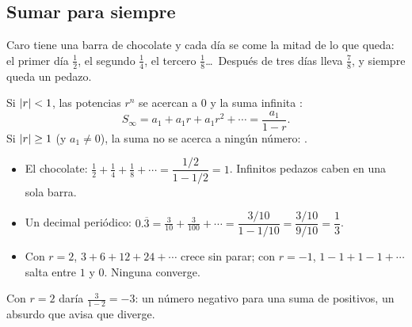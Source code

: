 \documentclass[11pt,a4paper]{article}
\begin{document}
\subsection{Sumar para siempre}
Caro tiene una barra de chocolate y cada día se come la mitad de lo que queda: el primer día $\frac12$, el segundo
$\frac14$, el tercero $\frac18$\dots\ Después de tres días lleva $\frac78$, y siempre queda un pedazo.
\begin{figura}
\end{figura}

\begin{propiedad}
Si $\left\lvert r\right\rvert<1$, las potencias $r^{n}$ se acercan a $0$ y la suma infinita :
\[ S_\infty=a_1+a_1r+a_1r^{2}+\cdots=\frac{a_1}{1-r}. \]
Si $\left\lvert r\right\rvert\ge 1$ (y $a_1\neq0$), la suma no se acerca a ningún número: .
\end{propiedad}
\begin{ejemplo}
\begin{itemize}
\item El chocolate: $\frac12+\frac14+\frac18+\cdots=\dfrac{1/2}{1-1/2}=1$. Infinitos pedazos caben en una sola barra.
\item Un decimal periódico: $0.\overline{3}=\frac{3}{10}+\frac{3}{100}+\cdots=\dfrac{3/10}{1-1/10}=\dfrac{3/10}{9/10}=\dfrac13$.
\item Con $r=2$, $3+6+12+24+\cdots$ crece sin parar; con $r=-1$, $1-1+1-1+\cdots$ salta entre $1$ y $0$. Ninguna converge.
\end{itemize}
\end{ejemplo}
\begin{ojo}
Con $r=2$ daría $\frac{3}{1-2}=-3$: un número negativo para una suma de positivos, un absurdo que avisa que diverge.
\end{ojo}
\end{document}
